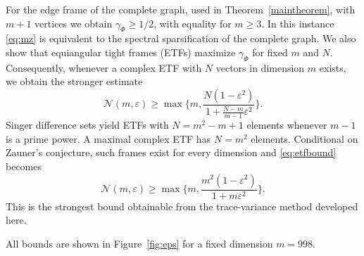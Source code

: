 \documentclass[a4paper]{amsart}
\numberwithin{equation}{section}
\begin{document}
For the edge frame of the complete graph, used in Theorem~\ref{maintheorem}, with $m+1$ vertices we obtain $\gamma_\Phi\ge 1/2$, with equality for $m\ge3$.
In this instance \eqref{eq:mz} is equivalent to the spectral sparsification of the complete graph.
We also show that equiangular tight frames (ETFs) maximize $\gamma_\Phi$ for fixed $m$ and $N$.
Consequently, whenever a complex ETF with $N$ vectors in dimension $m$ exists, we obtain the stronger estimate
\begin{equation}\label{eq:etfbound}
    \mathcal N(m,\varepsilon)
    \ge \max\Big\{m,\frac{N(1-\varepsilon^2)}{1+\frac{N-m}{m-1}\varepsilon^2}\Big\}.
\end{equation}
Singer difference sets yield ETFs with $N=m^2-m+1$ elements whenever $m-1$ is a prime power.
A maximal complex ETF has $N=m^2$ elements.
Conditional on Zauner's conjecture, such frames exist for every dimension and \eqref{eq:etfbound} becomes
\begin{equation*}
    \mathcal N(m,\varepsilon)
    \ge \max\Big\{m,\frac{m^2(1-\varepsilon^2)}{1+m\varepsilon^2}\Big\}.
\end{equation*}
This is the strongest bound obtainable from the trace-variance method developed here.

All bounds are shown in Figure~\ref{fig:eps} for a fixed dimension $m=998$.
\end{document}
